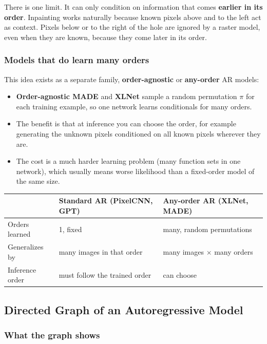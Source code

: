 There is one limit. It can only condition on information that comes \textbf{earlier in its order}. Inpainting works naturally because known pixels above and to the left act as context. Pixels below or to the right of the hole are ignored by a raster model, even when they are known, because they come later in its order.

\subsubsection*{Models that do learn many orders}

This idea exists as a separate family, \textbf{order-agnostic} or \textbf{any-order} AR models:
\begin{itemize}
  \item \textbf{Order-agnostic MADE} and \textbf{XLNet} sample a random permutation $\pi$ for each training example, so one network learns conditionals for many orders.
  \item The benefit is that at inference you can choose the order, for example generating the unknown pixels conditioned on all known pixels wherever they are.
  \item The cost is a much harder learning problem (many function sets in one network), which usually means worse likelihood than a fixed-order model of the same size.
\end{itemize}

\begin{tabular}{lll}
\toprule
 & Standard AR (PixelCNN, GPT) & Any-order AR (XLNet, MADE) \\
\midrule
Orders learned & 1, fixed & many, random permutations \\
Generalizes by & many images in that order & many images $\times$ many orders \\
Inference order & must follow the trained order & can choose \\
\bottomrule
\end{tabular}

\subsection*{Directed Graph of an Autoregressive Model}

\subsubsection*{What the graph shows}

